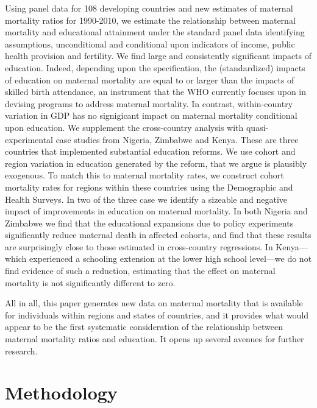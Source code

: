 \documentclass{article}[12pt,subeqn]
\begin{document}
\begin{spacing}{1.4}
Using panel data for 108 developing countries and new estimates of maternal 
mortality ratios for 1990-2010, we estimate the relationship between maternal 
mortality and educational attainment under the standard panel data identifying 
assumptions, unconditional and conditional upon indicators of income, public 
health provision and fertility. We find large and consistently significant impacts 
of education. Indeed, depending upon the specification, the (standardized) impacts 
of education on maternal mortality are equal to or larger than the impacts of 
skilled birth attendance, an instrument that the WHO currently focuses upon in 
devising programs to address maternal mortality. In contrast, within-country 
variation in GDP has no signigicant impact on maternal mortality conditional upon 
education. We supplement the cross-country analysis with quasi-experimental case 
studies from Nigeria, Zimbabwe and Kenya. These are three countries that 
implemented substantial education reforms. We use cohort and region variation in 
education generated by the reform, that we argue is plausibly exogenous. To match 
this to maternal mortality rates, we construct cohort mortality rates for regions 
within these countries using the Demographic and Health Surveys. In two of the 
three case we identify a sizeable and negative impact of improvements in education 
on maternal mortality. In both Nigeria and Zimbabwe we find that the educational 
expansions due to policy experiments significantly reduce maternal death in
affected cohorts, and find that these results are surprisingly close to those 
estimated in cross-country regressions.  In Kenya---which experienced a schooling 
extension at the lower high school level---we do not find evidence of such a 
reduction, estimating that the effect on maternal mortality is not significantly
different to zero.

All in all, this paper generates new data on maternal mortality that is available 
for individuals within regions and states of countries, and it provides what would 
appear to be the first systematic consideration of the relationship between 
maternal mortality ratios and education. It opens up several avenues for further 
research.

\section{Methodology}

\end{spacing}
\end{document}
